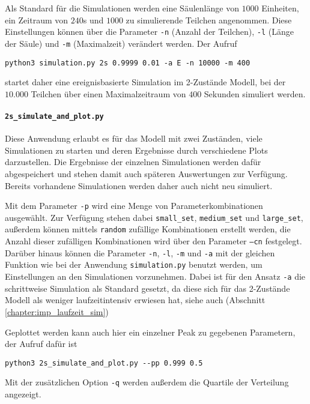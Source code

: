 Als Standard für die Simulationen werden eine Säulenlänge von $1000$ Einheiten, ein Zeitraum von $240$s und $1000$ zu simulierende Teilchen angenommen. Diese Einstellungen können über die Parameter \texttt{-n} (Anzahl der Teilchen), \texttt{-l} (Länge der Säule) und \verb!-m! (Maximalzeit) verändert werden.
Der Aufruf
\begin{verbatim}
python3 simulation.py 2s 0.9999 0.01 -a E -n 10000 -m 400
\end{verbatim}
startet daher eine ereignisbasierte Simulation im 2-Zustände Modell, bei der $10.000$ Teilchen über einen Maximalzeitraum von $400$ Sekunden simuliert werden.


\paragraph{\texttt{2s\_simulate\_and\_plot.py}}
Diese Anwendung erlaubt es für das Modell mit zwei Zuständen, viele Simulationen zu starten und deren Ergebnisse durch verschiedene Plots darzustellen. Die Ergebnisse der einzelnen Simulationen werden dafür abgespeichert und stehen damit auch späteren Auswertungen zur Verfügung. Bereits vorhandene Simulationen werden daher auch nicht neu simuliert.

Mit dem Parameter \texttt{-p} wird eine Menge von Parameterkombinationen ausgewählt. Zur Verfügung stehen dabei \texttt{small\_set}, \texttt{medium\_set} und \texttt{large\_set}, außerdem können mittels \texttt{random} zufällige Kombinationen erstellt werden, die Anzahl dieser zufälligen Kombinationen wird über den Parameter \texttt{--cn} festgelegt. %
Darüber hinaus können die Parameter \texttt{-n}, \texttt{-l}, \texttt{-m} und \texttt{-a} mit der gleichen Funktion wie bei der Anwendung \texttt{simulation.py} benutzt werden, um Einstellungen an den Simulationen vorzunehmen. Dabei ist für den Ansatz \texttt{-a} die schrittweise Simulation als Standard gesetzt, da diese sich für das 2-Zustände Modell als weniger laufzeitintensiv erwiesen hat, siehe auch (Abschnitt \ref{chapter:imp_laufzeit_sim})

Geplottet werden kann auch hier ein einzelner Peak zu gegebenen Parametern, der Aufruf dafür ist
\begin{verbatim}
python3 2s_simulate_and_plot.py --pp 0.999 0.5 
\end{verbatim}
Mit der zusätzlichen Option \verb!-q! werden außerdem die Quartile der Verteilung angezeigt.

